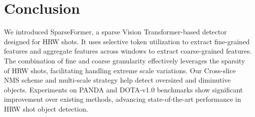 \section{Conclusion}
We introduced SparseFormer, a sparse Vision Transformer-based detector designed for HRW shots. It uses selective token utilization to extract fine-grained features and aggregate features across windows to extract coarse-grained features. The combination of fine and coarse granularity effectively leverages the sparsity of HRW shots, facilitating handling extreme scale variations. Our Cross-slice NMS scheme and multi-scale strategy help detect oversized and diminutive objects. Experiments on PANDA and DOTA-v1.0 benchmarks show significant improvement over existing methods, advancing state-of-the-art performance in HRW shot object detection.